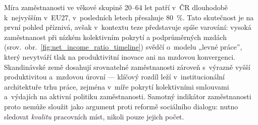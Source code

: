Míra zaměstnanosti ve věkové skupině 20--64 let patří v~ČR dlouhodobě k~nejvyšším v~EU27, v~posledních letech přesahuje \SI{80}{\percent}.
Tato skutečnost je na první pohled příznivá, avšak v~kontextu teze představuje spíše varování: vysoká zaměstnanost při nízkém kolektivním pokrytí a podprůměrných mzdách (srov.~obr.~\ref{fig:net_income_ratio_timeline}) svědčí o~modelu „levné práce”, který nevytváří tlak na produktivitní inovace ani na mzdovou konvergenci.
Skandinávské země dosahují srovnatelné zaměstnanosti zároveň s~výrazně vyšší produktivitou a~mzdovou úrovní --- klíčový rozdíl leží v~institucionální architektuře trhu práce, zejména v~míře pokrytí kolektivními smlouvami a~výdajích na aktivní politiku zaměstnanosti.
Samotný indikátor zaměstnanosti proto nemůže sloužit jako argument proti reformě sociálního dialogu: nutno sledovat \emph{kvalitu} pracovních míst, nikoli pouze jejich počet.


